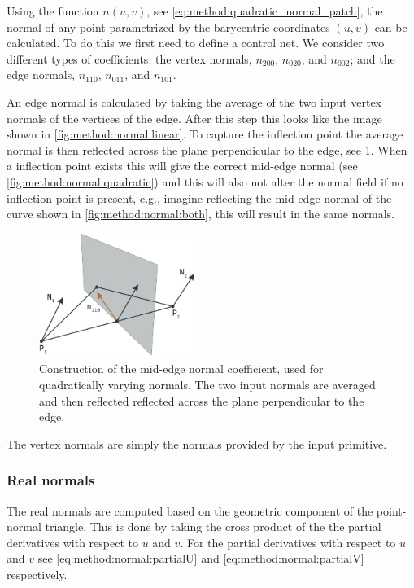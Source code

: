 
	Using the function $n(u,v)$, see \eqref{eq:method:quadratic_normal_patch}, the normal of any point parametrized by the barycentric coordinates $(u,v)$ can be calculated. To do this we first need to define a control net. We consider two different types of coefficients: the vertex normals, $n_{200}$, $n_{020}$, and $n_{002}$; and the edge normals, $n_{110}$, $n_{011}$, and $n_{101}$.

	An edge normal is calculated by taking the average of the two input vertex normals of the vertices of the edge. After this step this looks like the image shown in \cref{fig:method:normal:linear}. To capture the inflection point the average normal is then reflected across the plane perpendicular to the edge, see \cref{fig:method:normal:reflection}. When a inflection point exists this will give the correct mid-edge normal (see \cref{fig:method:normal:quadratic}) and this will also not alter the normal field if no inflection point is present, e.g., imagine reflecting the mid-edge normal of the curve shown in \cref{fig:method:normal:both}, this will result in the same normals.

	\begin{figure}
		\centering
		\includegraphics[width=0.45\textwidth]{./content/img/method/normal_reflection.png}
		\caption{Construction of the mid-edge normal coefficient, used for quadratically varying normals. The two input normals are averaged and then reflected reflected across the plane perpendicular to the edge.}
		\label{fig:method:normal:reflection}
	\end{figure}

	The vertex normals are simply the normals provided by the input primitive.

\subsubsection{Real normals}
\label{sss:method:normals:realNormals}
		The real normals are computed based on the geometric component of the point-normal triangle. This is done by taking the cross product of the the partial derivatives with respect to $u$ and $v$. For the partial derivatives with respect to $u$ and $v$ see \eqref{eq:method:normal:partialU} and \eqref{eq:method:normal:partialV} respectively.

